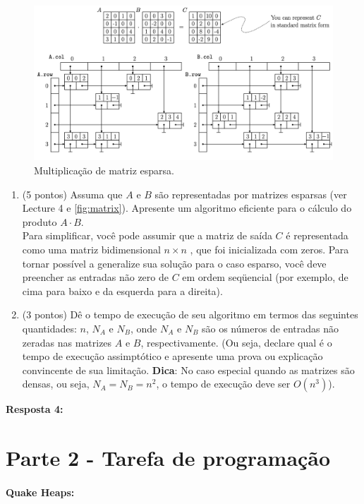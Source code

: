 \documentclass{article}
\begin{document}
\begin{figure}[!h]
  \centering  
    \includegraphics[width=.9\textwidth]{figures/matrix.png}
  \caption{Multiplicação de matriz esparsa.}
  \label{fig:matrix}
\end{figure}


\begin{enumerate}[label*=4.\arabic*.]
  \item (5 pontos) Assuma que $A$ e $B$ são representadas por matrizes esparsas (ver Lecture 4 e \autoref{fig:matrix}). Apresente um algoritmo eficiente para o cálculo do produto $A\cdot B$. \\
  Para simplificar, você pode assumir que a matriz de saída $C$ é representada como uma matriz bidimensional $n \times n$ , que foi inicializada com zeros.
  Para tornar possível a generalize sua solução para o caso esparso, você deve preencher as entradas não zero de $C$ em ordem seqüencial (por exemplo, de cima para baixo e da esquerda para a direita).
  \item (3 pontos) Dê o tempo de execução de seu algoritmo em termos das seguintes quantidades: $n$, $N_A$ e $N_B$, onde $N_A$ e $N_B$ são os números de entradas não zeradas nas matrizes $A$ e $B$, respectivamente. (Ou seja, declare qual é o tempo de execução assimptótico e apresente uma prova ou explicação convincente de sua limitação. \textbf{Dica}: No caso especial quando as matrizes são densas, ou seja, $N_A = N_B = n^2$, o tempo de execução deve ser $O(n^3)$).
\end{enumerate}

\textbf{Resposta 4:}

\newpage
\section*{Parte 2 - Tarefa de programação}

\paragraph{Quake Heaps:}
\end{document}

